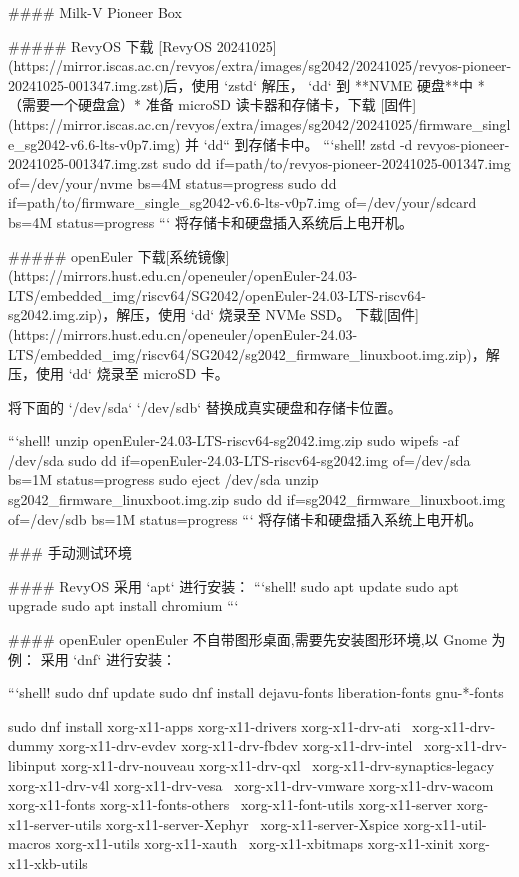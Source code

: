 \documentclass{article}
\begin{document}
\begin{markdown}
#### Milk-V Pioneer Box

##### RevyOS
下载 [RevyOS 20241025](https://mirror.iscas.ac.cn/revyos/extra/images/sg2042/20241025/revyos-pioneer-20241025-001347.img.zst)后，使用 `zstd` 解压， `dd` 到 **NVME 硬盘**中 *（需要一个硬盘盒）*
准备 microSD 读卡器和存储卡，下载 [固件](https://mirror.iscas.ac.cn/revyos/extra/images/sg2042/20241025/firmware_single_sg2042-v6.6-lts-v0p7.img) 并 `dd`` 到存储卡中。
```shell!
zstd -d revyos-pioneer-20241025-001347.img.zst
sudo dd if=path/to/revyos-pioneer-20241025-001347.img of=/dev/your/nvme bs=4M status=progress
sudo dd if=path/to/firmware_single_sg2042-v6.6-lts-v0p7.img of=/dev/your/sdcard bs=4M status=progress
```
将存储卡和硬盘插入系统后上电开机。

##### openEuler
下载[系统镜像](https://mirrors.hust.edu.cn/openeuler/openEuler-24.03-LTS/embedded_img/riscv64/SG2042/openEuler-24.03-LTS-riscv64-sg2042.img.zip)，解压，使用 `dd` 烧录至 NVMe SSD。
下载[固件](https://mirrors.hust.edu.cn/openeuler/openEuler-24.03-LTS/embedded_img/riscv64/SG2042/sg2042_firmware_linuxboot.img.zip)，解压，使用 `dd` 烧录至 microSD 卡。

将下面的 `/dev/sda` `/dev/sdb` 替换成真实硬盘和存储卡位置。

```shell!
unzip openEuler-24.03-LTS-riscv64-sg2042.img.zip
sudo wipefs -af /dev/sda
sudo dd if=openEuler-24.03-LTS-riscv64-sg2042.img of=/dev/sda bs=1M status=progress
sudo eject /dev/sda
unzip sg2042_firmware_linuxboot.img.zip
sudo dd if=sg2042_firmware_linuxboot.img of=/dev/sdb bs=1M status=progress
```
将存储卡和硬盘插入系统上电开机。

### 手动测试环境

#### RevyOS
采用 `apt` 进行安装：
```shell!
sudo apt update
sudo apt upgrade
sudo apt install chromium
```

#### openEuler
openEuler 不自带图形桌面,需要先安装图形环境,以 Gnome 为例：
采用 `dnf` 进行安装：

```shell!
sudo dnf update
sudo dnf install dejavu-fonts liberation-fonts gnu-*-fonts

sudo dnf install xorg-x11-apps xorg-x11-drivers xorg-x11-drv-ati \
 xorg-x11-drv-dummy xorg-x11-drv-evdev xorg-x11-drv-fbdev xorg-x11-drv-intel \
 xorg-x11-drv-libinput xorg-x11-drv-nouveau xorg-x11-drv-qxl \
 xorg-x11-drv-synaptics-legacy xorg-x11-drv-v4l xorg-x11-drv-vesa \
 xorg-x11-drv-vmware xorg-x11-drv-wacom xorg-x11-fonts xorg-x11-fonts-others \
 xorg-x11-font-utils xorg-x11-server xorg-x11-server-utils xorg-x11-server-Xephyr \
 xorg-x11-server-Xspice xorg-x11-util-macros xorg-x11-utils xorg-x11-xauth \
 xorg-x11-xbitmaps xorg-x11-xinit xorg-x11-xkb-utils


\end{markdown}
\end{document}

